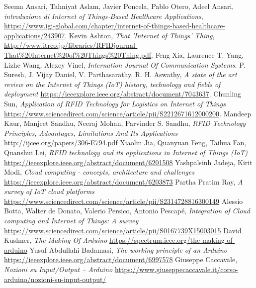 \documentclass[a4paper,titlepage]{report}
\begin{document}
\begin{thebibliography}{99}
Seema Ansari, Tahniyat Aslam, Javier Poncela, Pablo Otero, Adeel Ansari,
\emph{introduzione di Internet of Things-Based Healthcare Applications},
\url{https://www.igi-global.com/chapter/internet-of-things-based-healthcare-applications/243907}.
Kevin Ashton,
\emph{That 'Internet of Things' Thing},
\url{http://www.itrco.jp/libraries/RFIDjournal-That%20Internet%20of%20Things%20Thing.pdf}.
Feng Xia, Laurence T. Yang, Lizhe Wang, Alexey Vinel,
\emph{Internation Journal Of Communication Systems.}
P. Suresh, J. Vijay Daniel, V. Parthasarathy, R. H. Aswathy,
\emph{A state of the art review on the Internet of Things (IoT) history, technology and fields of deployment}
\url{https://ieeexplore.ieee.org/abstract/document/7043637}.
Chunling Sun,
\emph{Application of RFID Technology for Logistics on Internet of Things}
\url{https://www.sciencedirect.com/science/article/pii/S2212671612000200}.
Mandeep Kaur, Manjeet Sandhu, Neeraj Mohan, Parvinder S. Sandhu,
\emph{RFID Technology Principles, Advantages, Limitations And Its Applications}
\url{http://ijcee.org/papers/306-E794.pdf}
Xiaolin Jia, Quanyuan Feng, Taihua Fan, Quanshui Lei,
\emph{RFID technology and its applications in Internet of Things (IoT)}
\url{https://ieeexplore.ieee.org/abstract/document/6201508}
Yashpalsinh Jadeja, Kirit Modi,
\emph{Cloud computing - concepts, architecture and challenges}
\url{https://ieeexplore.ieee.org/abstract/document/6203873}
\newpage
{}
Partha Pratim Ray,
\emph{A survey of IoT cloud platforms}
\url{https://www.sciencedirect.com/science/article/pii/S2314728816300149}
Alessio Botta, Walter de Donato, Valerio Persico, Antonio Pescapé,
\emph{Integration of Cloud computing and Internet of Things: A survey}
\url{https://www.sciencedirect.com/science/article/pii/S0167739X15003015}
David Kushner,
\emph{The Making Of Arduino}
\url{https://spectrum.ieee.org/the-making-of-arduino}
Yusuf Abdullahi Badamasi,
\emph{The working principle of an Arduino}
\url{https://ieeexplore.ieee.org/abstract/document/6997578}
Giuseppe Caccavale,
\emph{Nozioni su Input/Output – Arduino}
\url{https://www.giuseppecaccavale.it/corso-arduino/nozioni-su-input-output/}
\end{thebibliography}
\end{document}
